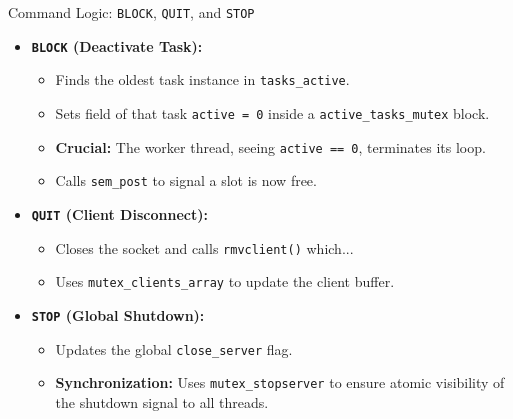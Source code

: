 \begin{frame}{Command Logic: \texttt{BLOCK}, \texttt{QUIT}, and \texttt{STOP}}
    \begin{itemize}
        \item \textbf{\texttt{BLOCK} (Deactivate Task):}
        \begin{itemize}
            \item Finds the oldest task instance in \texttt{tasks\_active}.
            \item Sets field of that task \texttt{active = 0} inside a \texttt{active\_tasks\_mutex} block.
            \item \textbf{Crucial:} The worker thread, seeing \texttt{active == 0}, terminates its loop.
            \item Calls \texttt{sem\_post} to signal a slot is now free.
        \end{itemize}
        \item \textbf{\texttt{QUIT} (Client Disconnect):}
        \begin{itemize}
            \item Closes the socket and calls \texttt{rmvclient()} which...
            \item Uses \texttt{mutex\_clients\_array} to update the client buffer.
        \end{itemize}
        \item \textbf{\texttt{STOP} (Global Shutdown):}
        \begin{itemize}
            \item Updates the global \texttt{close\_server} flag.
            \item \textbf{Synchronization:} Uses \texttt{mutex\_stopserver} to ensure atomic visibility of the shutdown signal to all threads.
        \end{itemize}
    \end{itemize}
\end{frame}





